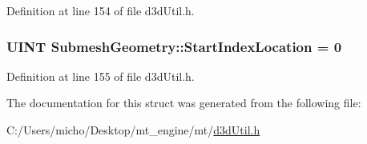Definition at line 154 of file d3d\+Util.\+h.

\subsubsection[{\texorpdfstring{Start\+Index\+Location}{StartIndexLocation}}]{\setlength{\rightskip}{0pt plus 5cm}U\+I\+NT Submesh\+Geometry\+::\+Start\+Index\+Location = 0}\hypertarget{struct_submesh_geometry_a56f8aee51b11ee61a229679000a1aeb6_a56f8aee51b11ee61a229679000a1aeb6}{}\label{struct_submesh_geometry_a56f8aee51b11ee61a229679000a1aeb6_a56f8aee51b11ee61a229679000a1aeb6}


Definition at line 155 of file d3d\+Util.\+h.



The documentation for this struct was generated from the following file\+:\begin{DoxyCompactItemize}
\item 
C\+:/\+Users/micho/\+Desktop/mt\+\_\+engine/mt/\hyperlink{d3d_util_8h}{d3d\+Util.\+h}\end{DoxyCompactItemize}
